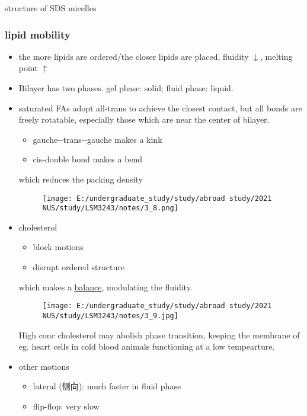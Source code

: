 \documentclass[]{article}
\begin{document}
structure of SDS micelles

\hypertarget{lipid-mobility}{%
\subsubsection{lipid mobility}\label{lipid-mobility}}

\begin{itemize}
\item
  the more lipids are ordered/the closer lipids are placed, fluidity
  \(\downarrow\), melting point \(\uparrow\)
\item
  Bilayer has two phases. gel phase: solid; fluid phase: liquid.
\item
  saturated FAs adopt all-trans to achieve the closest contact, but all
  bonds are freely rotatable, especially those which are near the center
  of bilayer.

  \begin{itemize}
  \item
    gauche-\/-trans-\/-gauche makes a kink
  \item
    cis-double bond makes a bend
  \end{itemize}

  which reduces the packing density

  \begin{figure}
  \centering
  \texttt{[image: E:/undergraduate\_study/study/abroad study/2021 NUS/study/LSM3243/notes/3\_8.png]}
  \caption{}
  \end{figure}
\item
  cholesterol

  \begin{itemize}
  \item
    block motions
  \item
    disrupt ordered structure
  \end{itemize}

  which makes a \underline{balance}, modulating the fluidity.

  \begin{figure}
  \centering
  \texttt{[image: E:/undergraduate\_study/study/abroad study/2021 NUS/study/LSM3243/notes/3\_9.jpg]}
  \caption{}
  \end{figure}

  High conc cholesterol may abolish phase transition, keeping the
  membrane of eg. heart cells in cold blood animals functioning at a low
  tempearture.
\item
  other motions

  \begin{itemize}
  \item
    lateral (侧向): much faster in fluid phase
  \item
    flip-flop: very slow
  \end{itemize}
\end{itemize}
\end{document}
